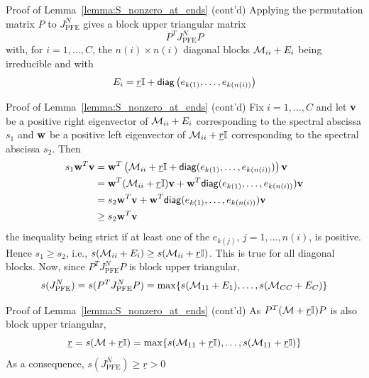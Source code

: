 \documentclass[aspectratio=169]{beamer}
\begin{document}
\begin{frame}{Proof of Lemma~\ref{lemma:S_nonzero_at_ends} (cont'd)}
	Applying the permutation matrix $P$ to $J_{\textrm{PFE}}^N$ gives a block upper triangular matrix 
	\[
	P^TJ_{\textrm{PFE}}^NP
	\]
	with, for $i=1,\ldots,C$, the $n(i)\times n(i)$ diagonal blocks $\mathcal{M}_{ii}+E_i$ being irreducible and with
	\[
	E_i = \underline{r}\mathbb{I}
	+\mathsf{diag}\left(e_{k(1)},\ldots,e_{k(n(i))}\right)
	\]
\end{frame}


\begin{frame}{Proof of Lemma~\ref{lemma:S_nonzero_at_ends} (cont'd)}
	Fix $i=1,\ldots,C$ and let $\mathbf{v}$ be a positive right eigenvector of $\mathcal{M}_{ii}+E_i$ corresponding to the spectral abscissa $s_1$ and $\mathbf{w}$ be a positive left eigenvector of $\mathcal{M}_{ii}+\underline{r}\mathbb{I}$ corresponding to the spectral abscissa $s_2$.
	Then
	\begin{align*}
	s_1\mathbf{w}^T\mathbf{v} &= 
	\mathbf{w}^T\left(\mathcal{M}_{ii}+\underline{r}\mathbb{I} +\mathsf{diag}(e_{k(1)},\ldots,e_{k(n(i))})\right)\mathbf{v} \\
	&= \mathbf{w}^T (\mathcal{M}_{ii}+\underline{r}\mathbb{I})\mathbf{v} + \mathbf{w}^T \mathsf{diag}(e_{k(1)},\ldots,e_{k(n(i))})\mathbf{v} \\
	&= s_2\mathbf{w}^T\mathbf{v} +\mathbf{w}^T \mathsf{diag}(e_{k(1)},\ldots,e_{k(n(i))})\mathbf{v} \\
	&\geq s_2\mathbf{w}^T\mathbf{v}
	\end{align*}
	the inequality being strict if at least one of the $e_{k(j)}$, $j=1,\ldots,n(i)$, is positive.
	Hence $s_1\geq s_2$, i.e., $s(\mathcal{M}_{ii}+E_i)\geq s(\mathcal{M}_{ii}+\underline{r}\mathbb{I})$. 
	This is true for all diagonal blocks. Now, since $P^TJ_{\textrm{PFE}}^N P$ is block upper triangular, 
	\[
	s(J_{\textrm{PFE}}^N)=s(P^TJ_{\textrm{PFE}}^N P) =
	\max\{s(\mathcal{M}_{11}+E_1),\ldots,s(\mathcal{M}_{CC}+E_C)\}
	\]
\end{frame}

\begin{frame}{Proof of Lemma~\ref{lemma:S_nonzero_at_ends} (cont'd)}
	As $P^T(\mathcal{M}+\underline{r}\mathbb{I})P$ is also block upper triangular,
	\[
	\underline{r} = s(\mathcal{M}+\underline{r}\mathbb{I}) =
	\max\{s(\mathcal{M}_{11}+\underline{r}\mathbb{I}),
	\ldots,
	s(\mathcal{M}_{11}+\underline{r}\mathbb{I})\}
	\]
	\vfill
	As a consequence, $s(J_{\textrm{PFE}}^N)\geq \underline{r}>0$
\end{frame}
\end{document}
